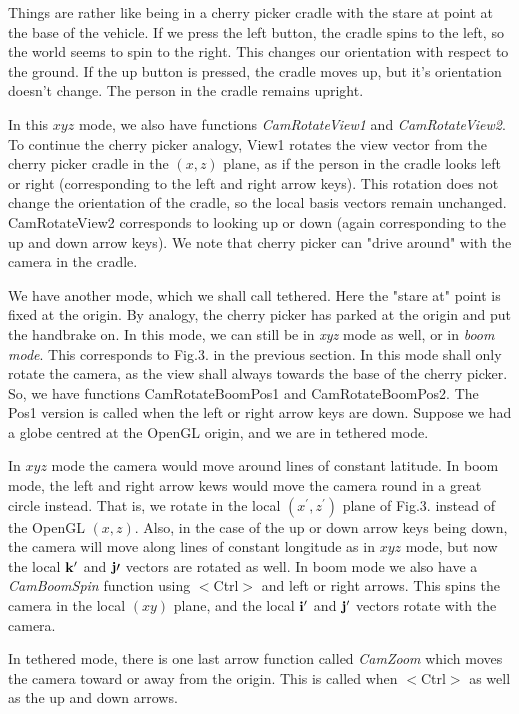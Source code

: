 \documentclass[12pt]{article}
\begin{document}
Things are rather like being in a cherry picker cradle with the stare at point
at the base of the vehicle. If we press the left button,  the cradle spins
to the left, so the world seems to spin to the right. This changes our orientation
with respect to the ground. If the up button is pressed, the cradle moves up,
but it's orientation doesn't change. The person in the cradle remains upright.

In this $xyz$ mode, we also have functions {\it CamRotateView1} and
 {\it CamRotateView2}. 
To continue the cherry picker analogy, View1 rotates the view vector from the 
cherry picker cradle in the $(x,z)$ plane, as if the person in the cradle
looks left or right (corresponding to the left and right arrow keys). 
This rotation does not change the orientation of the cradle, so the
local basis vectors remain unchanged. CamRotateView2 corresponds
to looking up or down (again corresponding to the up and down arrow keys).
We note that cherry picker can "drive around" with the camera in the cradle.

We have another mode, which we shall call {tethered}. Here the "stare at" point
is fixed at the origin. By analogy, the cherry picker has parked at the origin
and put the handbrake on.  In this mode, we can still be in {\it xyz} mode
as well, or in
{\it boom mode}. This  corresponds
to Fig.3. in the previous section. In this mode shall only rotate the camera,
as the view shall always towards the base of the cherry picker. So, we
have functions CamRotateBoomPos1 and CamRotateBoomPos2. The Pos1
version is called when the left or right arrow keys are down.
Suppose we had a globe centred at the OpenGL origin, and we are in tethered mode.

In $xyz$ mode the camera would move around lines of constant latitude. In boom
mode, the left and right arrow kews would move the camera round in a great circle
instead. That is, we rotate in the local $(x^\prime, z^\prime)$ plane of Fig.3. instead
of the OpenGL $(x,z)$. Also, in the case of the up or down arrow keys being
down, the camera will move along lines of constant longitude as in $xyz$ mode, but
now the local ${\bf k}^\prime$ and ${\bf j}\prime$ vectors are rotated as well.
In boom mode we also have a {\it CamBoomSpin} function using $<$Ctrl$>$ and 
left or right arrows. This spins the camera in the local $(xy)$ plane, and
the local ${\bf i}^\prime$ and ${\bf j}^\prime$ vectors rotate with the camera.

In tethered mode, there is one last arrow function called {\it CamZoom}
which moves the camera toward or away from the origin. This is called when 
 $<$Ctrl$>$  as well as the up and down arrows.
\end{document}
